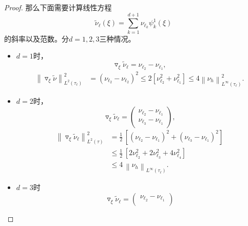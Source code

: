 \begin{proof}
那么下面需要计算线性方程
\begin{equation*}
\widetilde{\nu}_{\ell} (\xi) = \sum_{k=1}^{d+1} \nu_{\ell_{k}} \psi_{k}^{1} \left( \xi \right)
\end{equation*}
的斜率以及范数。分$d=1,2,3$三种情况。
\begin{itemize}
  \item $d=1$时，
  \begin{equation*}
    \triangledown_{\xi} \widetilde{\nu}_{\ell} = \nu_{\ell_{2}} - \nu_{\ell_{1}},
  \end{equation*}
  \begin{equation*}
    \begin{split}
      \left\| \triangledown_{\xi} \widetilde{\nu} \right\|_{L^{2}(\tau_{\ell})}^{2}
      & = \left( \nu_{\ell_{2}} - \nu_{\ell_{2}} \right)^{2}
      \le 2 \left[
      \nu_{\ell_{2}}^{2} + \nu_{\ell_{1}}^{2}
      \right]
      \le 4 \left\| \nu_{h} \right\|_{L^{\infty}(\tau_{\ell})}^{2}.
    \end{split}
  \end{equation*}
  \item $d=2$时，
  \begin{equation*}
    \triangledown_{\xi} \widetilde{\nu}_{\ell} =
    \begin{pmatrix}
      \nu_{\ell_{2}} - \nu_{\ell_{1}} \\
      \nu_{\ell_{3}} - \nu_{\ell_{1}}
    \end{pmatrix},
  \end{equation*}
  \begin{equation*}
    \begin{split}
    \left\| \triangledown_{\xi} \widetilde{\nu}_{\ell} \right\|_{L^{2}(\tau)}^{2}
    & = \frac{1}{2} \,
    \left[
    \left( \nu_{\ell_{2}} - \nu_{\ell_{1}} \right)^{2} +
    \left( \nu_{\ell_{3}} - \nu_{\ell_{1}} \right)^{2}
    \right] \\
    & \le \frac{1}{2} \,
    \left[
    2 \nu_{\ell_{2}}^{2} + 2 \nu_{\ell_{3}}^{2} + 4 \nu_{\ell_{4}}^{2}
    \right] \\
    & \le 4 \, \left\| \nu_{h} \right\|_{L^{\infty}(\tau_{\ell})}.
  \end{split}
  \end{equation*}
  \item $d=3$时
  \begin{equation*}
    \triangledown_{\xi} \widetilde{\nu}_{\ell} =
    \begin{pmatrix}
      \nu_{\ell_{2}} - \nu_{\ell_{1}} \\

\end{pmatrix}
\end{equation*}
\end{itemize}
\end{proof}
